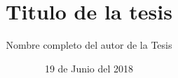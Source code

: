 \documentclass[11pt,openright,final]{unsa}
\title{Titulo de la tesis}
\author{Nombre completo del autor de la Tesis}%
\date{19 de Junio del 2018}
\begin{document}
\makeFirstCover \makeSecondCover %

\begin{frontmatter}
\approved{\cuatro}%
\dedicatory

\begin{singlespace}
\tableofcontents \listoffigures \listoftables \pagebreak
\end{singlespace}

%
%
%
\end{frontmatter}%

\pagestyle{fancyplain}








\begin{singlespace}

\end{singlespace}
\end{document}
